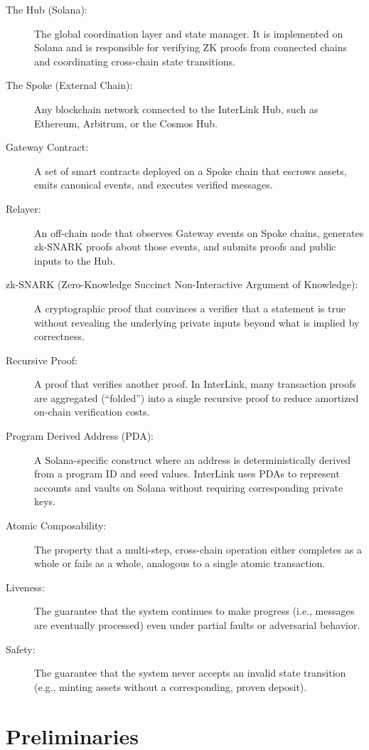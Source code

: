 \documentclass[11pt,a4paper]{article}
\begin{document}
\begin{description}
    \item[The Hub (Solana):] The global coordination layer and state manager. It is implemented on Solana and is responsible for verifying ZK proofs from connected chains and coordinating cross-chain state transitions.
    \item[The Spoke (External Chain):] Any blockchain network connected to the InterLink Hub, such as Ethereum, Arbitrum, or the Cosmos Hub.
    \item[Gateway Contract:] A set of smart contracts deployed on a Spoke chain that escrows assets, emits canonical events, and executes verified messages.
    \item[Relayer:] An off-chain node that observes Gateway events on Spoke chains, generates zk-SNARK proofs about those events, and submits proofs and public inputs to the Hub.
    \item[zk-SNARK (Zero-Knowledge Succinct Non-Interactive Argument of Knowledge):] A cryptographic proof that convinces a verifier that a statement is true without revealing the underlying private inputs beyond what is implied by correctness.
    \item[Recursive Proof:] A proof that verifies another proof. In InterLink, many transaction proofs are aggregated (``folded'') into a single recursive proof to reduce amortized on-chain verification costs.
    \item[Program Derived Address (PDA):] A Solana-specific construct where an address is deterministically derived from a program ID and seed values. InterLink uses PDAs to represent accounts and vaults on Solana without requiring corresponding private keys.
    \item[Atomic Composability:] The property that a multi-step, cross-chain operation either completes as a whole or fails as a whole, analogous to a single atomic transaction.
    \item[Liveness:] The guarantee that the system continues to make progress (i.e., messages are eventually processed) even under partial faults or adversarial behavior.
    \item[Safety:] The guarantee that the system never accepts an invalid state transition (e.g., minting assets without a corresponding, proven deposit).
\end{description}

\section{Preliminaries}
\label{sec:prelim}
\end{document}
